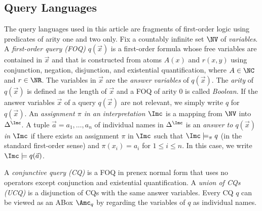 \documentclass{lmcs}
\theoremstyle{definition}
\begin{document}

\subsection{Query Languages}

The query languages used in this article are fragments of first-order
logic using predicates of arity one and two only.  Fix a countably
infinite set $\NV$ of \emph{variables}. A \emph{first-order query
  (FOQ)} $q(\vec{x})$ is %
a first-order formula
whose free variables are contained in $\vec{x}$ and that is
constructed from atoms $A(x)$ and $r(x,y)$ using conjunction,
negation, disjunction, and existential quantification, where
$A\in \NC$ and $r\in \NR$. The variables in $\vec{x}$ are the
\emph{answer variables} of $q(\vec{x})$. The \emph{arity} of
$q(\vec{x})$ is defined as the length of $\vec{x}$ and a FOQ of arity
$0$ is called \emph{Boolean}. If the answer variables $\vec{x}$ of a
query $q(\vec{x})$ are not relevant, we simply write $q$ for
$q(\vec{x})$.  An \emph{assignment $\pi$ in an interpretation $\Imc$}
is a mapping from $\NV$ into $\Delta^{\Imc}$.  A tuple
$\vec{a}=a_{1},\ldots,a_{n}$ of individual names in $\Delta^{\Imc}$ is
an \emph{answer to $q(\vec{x})$ in $\Imc$} if there exists an
assignment $\pi$ in $\Imc$ such that $\Imc\models_{\pi}q$ (in
the standard first-order sense) and $\pi(x_{i})=a_{i}$ for
$1\leq i \leq n$.  In this case, we write $\Imc\models q(\vec{a})$.

A \emph{conjunctive query (CQ)} is a FOQ in prenex normal form that
uses no operators except conjunction and existential quantification. A
\emph{union of CQs (UCQ)} is a disjunction of CQs with the
  same answer variables. 
Every CQ $q$ can be viewed as an ABox
$\Amc_{q}$ by regarding the variables of $q$ as individual names.
\end{document}

